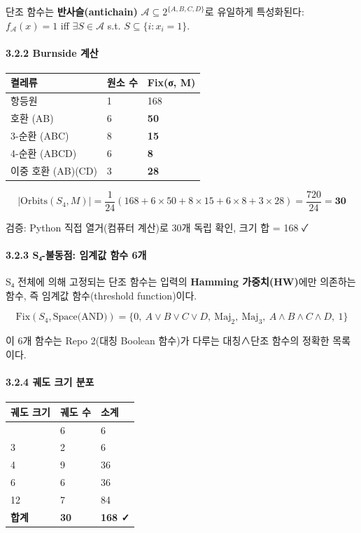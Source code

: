 \documentclass[
]{article}
\newcounter{none} %
\begin{document}
단조 함수는 \textbf{반사슬(antichain)}
\(\mathcal{A} \subseteq 2^{\{A,B,C,D\}}\)로 유일하게 특성화된다:
\(f_{\mathcal{A}}(x) = 1\) iff \(\exists S \in \mathcal{A}\) s.t.
\(S \subseteq \{i : x_i = 1\}\).

\paragraph{3.2.2 Burnside 계산}\label{burnside-uxacc4uxc0b0-1}

{\def\LTcaptype{none} %
\begin{longtable}[]{@{}lll@{}}
\toprule\noalign{}
켤레류 & 원소 수 & Fix(σ, M) \\
\midrule\noalign{}
\endhead
\bottomrule\noalign{}
\endlastfoot
항등원 & 1 & 168 \\
호환 (AB) & 6 & \textbf{50} \\
3-순환 (ABC) & 8 & \textbf{15} \\
4-순환 (ABCD) & 6 & \textbf{8} \\
이중 호환 (AB)(CD) & 3 & \textbf{28} \\
\end{longtable}
}

\[|\text{Orbits}(S_4, M)| = \frac{1}{24}(168 + 6 \times 50 + 8 \times 15 + 6 \times 8 + 3 \times 28) = \frac{720}{24} = \mathbf{30}\]

검증: Python 직접 열거(컴퓨터 계산)로 30개 독립 확인, 크기 합 = 168 ✓

\paragraph{3.2.3 S₄-불동점: 임계값 함수
6개}\label{sux2084-uxbd88uxb3d9uxc810-uxc784uxacc4uxac12-uxd568uxc218-6uxac1c}

S₄ 전체에 의해 고정되는 단조 함수는 입력의 \textbf{Hamming
가중치(HW)}에만 의존하는 함수, 즉 임계값 함수(threshold function)이다.

\[\text{Fix}(S_4, \text{Space(AND)}) = \{0,\ A \vee B \vee C \vee D,\ \text{Maj}_2,\ \text{Maj}_3,\ A \wedge B \wedge C \wedge D,\ 1\}\]

이 6개 함수는 Repo 2(대칭 Boolean 함수)가 다루는 대칭∧단조 함수의 정확한
목록이다.

\paragraph{3.2.4 궤도 크기
분포}\label{uxada4uxb3c4-uxd06cuxae30-uxbd84uxd3ec}

{\def\LTcaptype{none} %
\begin{longtable}[]{@{}lll@{}}
\toprule\noalign{}
궤도 크기 & 궤도 수 & 소계 \\
\midrule\noalign{}
\endhead
\bottomrule\noalign{}
\endlastfoot
1 & 6 & 6 \\
3 & 2 & 6 \\
4 & 9 & 36 \\
6 & 6 & 36 \\
12 & 7 & 84 \\
\textbf{합계} & \textbf{30} & \textbf{168 ✓} \\
\end{longtable}
}
\end{document}

